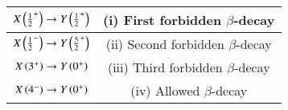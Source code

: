 \begin{table}[H]
\centering
\begin{tabular}{|c|c|}
\hline
$X \left(\frac{1}{2} ^{+}\right) \to Y \left(\frac{1}{2} ^{+}\right)$ & (i) First forbidden $\beta$-decay \\
\hline
$X \left(\frac{1}{2} ^{-}\right) \to Y \left(\frac{5}{2} ^{+}\right)$ & (ii) Second forbidden $\beta$-decay \\
\hline
$X \left( 3^{+}\right) \to Y \left(0^{+}\right)$ & (iii) Third forbidden $\beta$-decay \\
\hline
$X \left(4^{-}\right) \to Y \left(0^{+}\right)$ & (iv) Allowed $\beta$-decay \\
\hline
\end{tabular}
\label{tab: Q_12}
\end{table}
